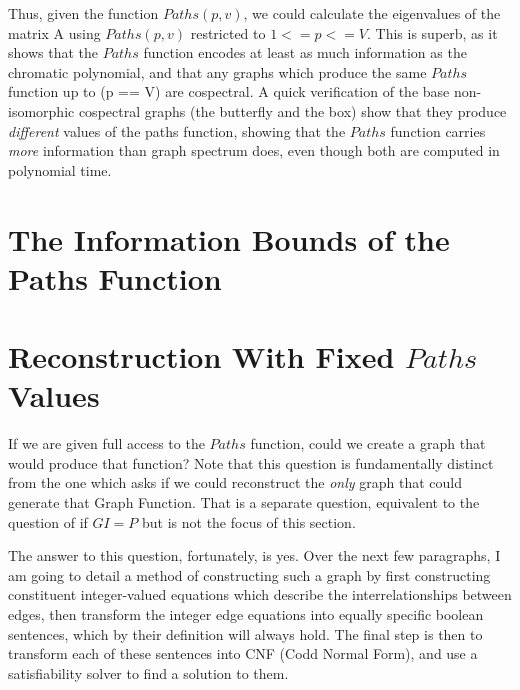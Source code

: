 \documentclass[a4paper,12pt]{article}
\begin{document}
Thus, given the function \(Paths(p, v)\), we could calculate the eigenvalues of the matrix A using \(Paths(p, v)\) restricted to \(1 <= p <= V\). This is superb, as it shows that the \(Paths\) function encodes at least as much information as the chromatic polynomial, and that any graphs which produce the same \(Paths\) function up to (p == V) are cospectral. A quick verification of the base non-isomorphic cospectral graphs (the butterfly and the box) show that they produce \emph{different} values of the paths function, showing that the \(Paths\) function carries \emph{more} information than graph spectrum does, even though both are computed in polynomial time.



\section{The Information Bounds of the Paths Function}


\section{Reconstruction With Fixed \(Paths\) Values}

If we are given full access to the \(Paths\) function, could we create a graph that would produce that function?  Note that this question is fundamentally distinct from the one which asks if we could reconstruct the \emph{only} graph that could generate that Graph Function.  That is a separate question, equivalent to the question of if \(GI = P\) but is not the focus of this section.

The answer to this question, fortunately, is yes.  Over the next few paragraphs, I am going to detail a method of constructing such a graph by first constructing constituent integer-valued equations which describe the interrelationships between edges, then transform the integer edge equations into equally specific boolean sentences, which by their definition will always hold.  The final step is then to transform each of these sentences into CNF (Codd Normal Form), and use a satisfiability solver to find a solution to them.
\end{document}
